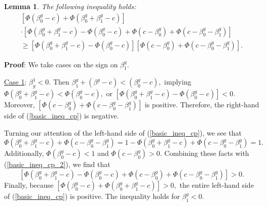 \documentclass[12pt]{article}
\newtheorem{lemma}{Lemma}
\begin{document}
\begin{appendices}
\begin{lemma}
The following inequality holds: 
\begin{multline}\label{basic_ineq_cp}
\left[\Phi(\beta^g_0 - c) + \Phi(\beta^g_0 + \beta^g_1 - c) \right] \\ \cdot \left[\Phi(\beta_0^g + \beta_1^g - c) - \Phi(\beta_0^g - c) + \Phi(c - \beta^g_0) + \Phi(c - \beta_0^g - \beta_1^g) \right] \\ \geq \left[\Phi(\beta_0^g + \beta_1^g - c) - \Phi(\beta_0^g - c)\right]\left[\Phi(c - \beta^g_0) + \Phi(c - \beta_0^g - \beta_1^g)\right].
\end{multline}
\end{lemma}
\textbf{Proof}: We take cases on the sign on $\beta^g_1$.

\noindent
\underline{Case 1}: $\beta^1_g < 0$. Then $ \beta^g_1 + (\beta^g - c) < (\beta^g_0 - c),$ implying $\Phi(\beta^g_0 + \beta^g_1 - c) < \Phi(\beta^g_0 - c),$ or $[\Phi(\beta^g_0 + \beta^g_1 - c) - \Phi(\beta^g_0 - c)] < 0.$ Moreover, $[\Phi(c - \beta^g_0) + \Phi(c - \beta_0^g - \beta_1^g)]$ is positive. Therefore, the right-hand side of (\ref{basic_ineq_cp}) is negative.

Turning our attention of the left-hand side of (\ref{basic_ineq_cp}), we see that
\begin{equation}\label{basic_ineq_cp_2}
\Phi(\beta^g_0 + \beta^g_1 - c) + \Phi( c - \beta^g_0 - \beta^g_1) = 1 -\Phi(\beta^g_0 + \beta^g_1 - c) + \Phi( c - \beta^g_0 - \beta^g_1) = 1.
\end{equation}
Additionally, $\Phi(\beta^g_0 - c) < 1$ and $ \Phi(c - \beta^g_0) > 0$. Combining these facts with (\ref{basic_ineq_cp_2}), we find that
$$ \left[\Phi(\beta_0^g + \beta_1^g - c) - \Phi(\beta_0^g - c) + \Phi(c - \beta^g_0) + \Phi(c - \beta_0^g - \beta_1^g) \right] > 0. $$ Finally, because $\left[\Phi(\beta^g_0 - c) + \Phi(\beta^g_0 + \beta^g_1 - c) \right] > 0,$ the entire left-hand side of (\ref{basic_ineq_cp}) is positive. The inequality holds for $\beta^g_1 < 0$.


\end{appendices}
\end{document}
